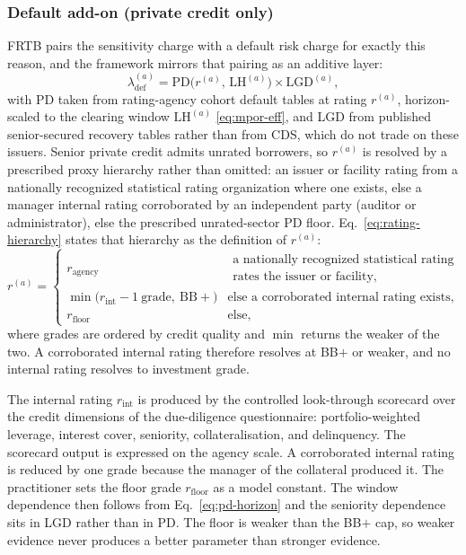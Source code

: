 \subsubsection{Default add-on (private credit only)}
FRTB pairs the sensitivity charge with a default risk charge for exactly this reason, and the framework mirrors that pairing as an additive layer:
\begin{equation}\label{eq:drc}
\lambda^{(a)}_{\mathrm{def}}=\mathrm{PD}\bigl(r^{(a)},\,\mathrm{LH}^{(a)}\bigr)\times\mathrm{LGD}^{(a)},
\end{equation}
with PD taken from rating-agency cohort default tables at rating $r^{(a)}$, horizon-scaled to the clearing window $\mathrm{LH}^{(a)}$ \eqref{eq:mpor-eff}, and LGD from published senior-secured recovery tables rather than from CDS, which do not trade on these issuers. Senior private credit admits unrated borrowers, so $r^{(a)}$ is resolved by a prescribed proxy hierarchy rather than omitted: an issuer or facility rating from a nationally recognized statistical rating organization where one exists, else a manager internal rating corroborated by an independent party (auditor or administrator), else the prescribed unrated-sector PD floor. Eq.~\eqref{eq:rating-hierarchy} states that hierarchy as the definition of $r^{(a)}$:
\begin{equation}\label{eq:rating-hierarchy}
r^{(a)} =
\begin{cases}
r_{\mathrm{agency}} & \substack{\text{a nationally recognized statistical rating organization}\\
\text{rates the issuer or facility,}}\\[4pt]
\min\bigl(r_{\mathrm{int}}-1\ \text{grade},\ \text{BB}+\bigr) & \text{else a corroborated internal rating exists,}\\[4pt]
r_{\mathrm{floor}} & \text{else,}
\end{cases}
\end{equation}
where grades are ordered by credit quality and $\min$ returns the weaker of the two. A corroborated internal rating therefore resolves at BB$+$ or weaker, and no internal rating resolves to investment grade.

The internal rating $r_{\mathrm{int}}$ is produced by the controlled look-through scorecard over the credit dimensions of the due-diligence questionnaire: portfolio-weighted leverage, interest cover, seniority, collateralisation, and delinquency. The scorecard output is expressed on the agency scale. A corroborated internal rating is reduced by one grade because the manager of the collateral produced it. The practitioner sets the floor grade $r_{\mathrm{floor}}$ as a model constant. The window dependence then follows from Eq.~\eqref{eq:pd-horizon} and the seniority dependence sits in LGD rather than in PD. The floor is weaker than the BB$+$ cap, so weaker evidence never produces a better parameter than stronger evidence.

